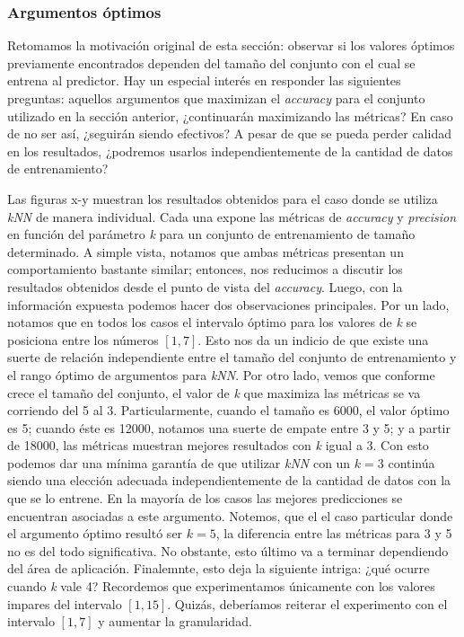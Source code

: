\subsubsection{Argumentos óptimos}
Retomamos la motivación original de esta sección: observar si los valores óptimos previamente encontrados dependen del tamaño del conjunto con el cual se entrena al predictor. Hay un especial interés en responder las siguientes preguntas: aquellos argumentos que maximizan el \emph{accuracy} para el conjunto utilizado en la sección anterior, ¿continuarán maximizando las métricas? En caso de no ser así, ¿seguirán siendo efectivos? A pesar de que se pueda perder calidad en los resultados, ¿podremos usarlos independientemente de la cantidad de datos de entrenamiento?
\par
[gráficos accuracy y precision en funcion k knn]
\par
Las figuras x-y muestran los resultados obtenidos para el caso donde se utiliza \emph{kNN} de manera individual. Cada una expone las métricas de \emph{accuracy} y \emph{precision} en función del parámetro \emph{k} para un conjunto de entrenamiento de tamaño determinado. A simple vista, notamos que ambas métricas presentan un comportamiento bastante similar; entonces, nos reducimos a discutir los resultados obtenidos desde el punto de vista del \emph{accuracy}. Luego, con la información expuesta podemos hacer dos observaciones principales. Por un lado, notamos que en todos los casos el intervalo óptimo para los valores de \emph{k} se posiciona entre los números $[1, 7]$. Esto nos da un indicio de que existe una suerte de relación independiente entre el tamaño del conjunto de entrenamiento y el rango óptimo de argumentos para \emph{kNN}. Por otro lado, vemos que conforme crece el tamaño del conjunto, el valor de \emph{k} que maximiza las métricas se va corriendo del 5 al 3. Particularmente, cuando el tamaño es 6000, el valor óptimo es 5; cuando éste es 12000, notamos una suerte de empate entre 3 y 5; y a partir de 18000, las métricas muestran mejores resultados con \emph{k} igual a 3. Con esto podemos dar una mínima garantía de que utilizar \emph{kNN} con un $k=3$ continúa siendo una elección adecuada independientemente de la cantidad de datos con la que se lo entrene. En la mayoría de los casos las mejores predicciones se encuentran asociadas a este argumento. Notemos, que el el caso particular donde el argumento óptimo resultó ser $k=5$, la diferencia entre las métricas para 3 y 5 no es del todo significativa. No obstante, esto último va a terminar dependiendo del área de aplicación. Finalemnte, esto deja la siguiente intriga: ¿qué ocurre cuando \emph{k} vale 4? Recordemos que experimentamos únicamente con los valores impares del intervalo $[1,15]$. Quizás, deberíamos reiterar el experimento con el intervalo $[1,7]$ y aumentar la granularidad.
